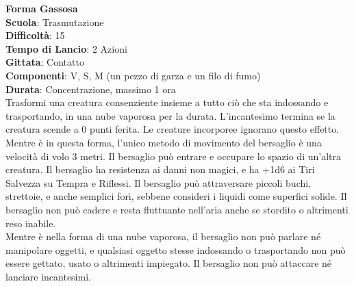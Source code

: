 \begin{multicols}{2}
\medskip\textbf{Forma Gassosa}\\
\textbf{Scuola}: Trasmutazione\\
\textbf{Difficoltà}: 15\\
\textbf{Tempo di Lancio}: 2 Azioni\\
\textbf{Gittata}: Contatto\\
\textbf{Componenti}: V, S, M (un pezzo di garza e un filo di fumo)\\
\textbf{Durata}: Concentrazione, massimo 1 ora\\
Trasformi una creatura consenziente insieme a tutto ciò che sta indossando e trasportando, in una nube vaporosa per la durata. L'incantesimo termina se la creatura scende a 0 punti ferita. Le creature incorporee ignorano questo effetto. Mentre è in questa forma, l'unico metodo di movimento del bersaglio è una velocità di volo 3 metri. Il bersaglio può entrare e occupare lo spazio di un'altra creatura. Il bersaglio ha resistenza ai danni non magici, e ha +1d6 ai Tiri Salvezza su Tempra e Riflessi. Il bersaglio può attraversare piccoli buchi, strettoie, e anche semplici fori, sebbene consideri i liquidi come superfici solide. Il bersaglio non può cadere e resta fluttuante nell'aria anche se stordito o altrimenti reso inabile.\\
Mentre è nella forma di una nube vaporosa, il bersaglio non può parlare né manipolare oggetti, e qualsiasi oggetto stesse indossando o trasportando non può essere gettato, usato o altrimenti impiegato. Il bersaglio non può attaccare né lanciare incantesimi. 


\end{multicols}
